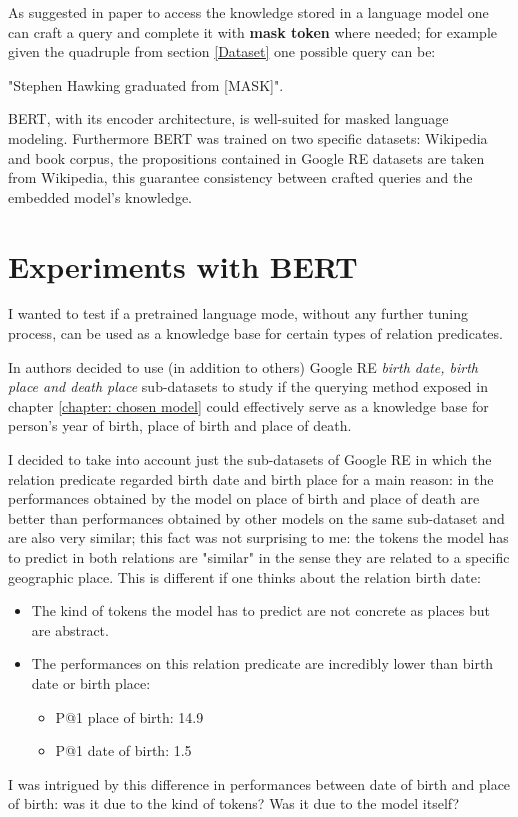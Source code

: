 \documentclass{article}
\begin{document}
As suggested in paper \cite{petroni2019language} to access the knowledge stored in a language model one can craft a query and complete it with \textbf{mask token} where needed; for example given the quadruple from section \ref{Dataset} one possible query can be:
\begin{center}
    "Stephen Hawking graduated from [MASK]".
\end{center}

BERT, with its encoder architecture, is well-suited for masked language modeling. Furthermore BERT was trained on two specific datasets: Wikipedia and book corpus, the propositions contained in Google RE datasets are taken from Wikipedia, this guarantee consistency between crafted queries and the embedded model's knowledge.

\section{Experiments with BERT}
I wanted to test if a pretrained language mode, without any further tuning process, can be used as a knowledge base for certain types of relation predicates.

In \cite{petroni2019language} authors decided to use (in addition to others) Google RE \textit{birth date, birth place and death place} sub-datasets to study if the querying method exposed in chapter \ref{chapter: chosen model} could effectively serve as a knowledge base for person's year of birth, place of birth and place of death.

I decided to take into account just the sub-datasets of Google RE in which the relation predicate regarded birth date and birth place for a main reason: in \cite{petroni2019language} the performances obtained by the model on place of birth and place of death are better than performances obtained by other models on the same sub-dataset and are also very similar; this fact was not surprising to me: the tokens the model has to predict in both relations are "similar" in the sense they are related to a specific geographic place. This is different if one thinks about the relation birth date:
\begin{itemize}
    \item The kind of tokens the model has to predict are not concrete as places but are abstract.
    \item The performances on this relation predicate are incredibly lower than birth date or birth place:
        \begin{itemize}
            \item P@1 place of birth: 14.9
            \item P@1 date of birth: 1.5
        \end{itemize}
\end{itemize}
I was intrigued by this difference in performances between date of birth and place of birth: was it due to the kind of tokens? Was it due to the model itself?
\end{document}
